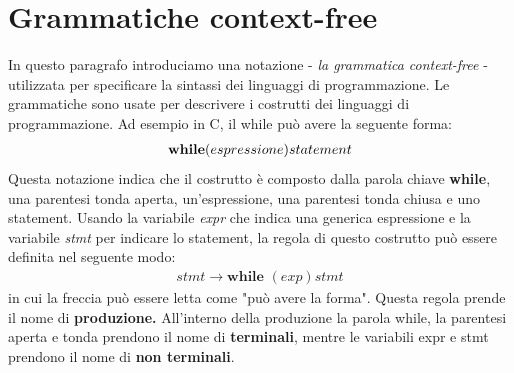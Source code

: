 \section{Grammatiche context-free}
In questo paragrafo introduciamo una notazione - \textit{la grammatica context-free} - utilizzata per specificare la sintassi dei linguaggi di programmazione. Le grammatiche sono usate per descrivere i costrutti dei linguaggi di programmazione. Ad esempio in C, il while può avere la seguente forma:
\begin{align}
	\textbf{while} (espressione) statement \notag
\end{align}
Questa notazione indica che il costrutto è composto dalla parola chiave \textbf{while}, una parentesi tonda aperta, un'espressione, una parentesi tonda chiusa e uno statement. Usando la variabile \textit{expr} che indica una generica espressione e la variabile \textit{stmt} per indicare lo statement, la regola di questo costrutto può essere definita nel seguente modo:
\begin{align}\label{regolaWhile}
	stmt \to \textbf{while } ( exp ) stmt 
\end{align}
in cui la freccia può essere letta come "può avere la forma". Questa regola prende il nome di \textbf{produzione. }All'interno della produzione la parola while, la parentesi aperta e tonda prendono il nome di \textbf{terminali}, mentre le variabili expr e stmt prendono il nome di \textbf{non terminali}.
